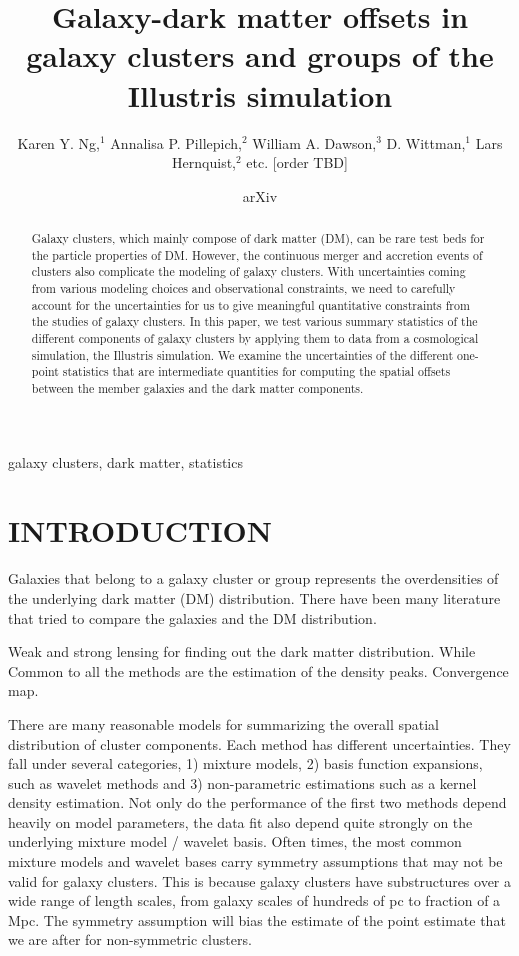 \documentclass[usenatbib]{mn2e}
\title[Galaxy-dark matter offsets in galaxy clusters and groups of the
Illustris simulation]
{Galaxy-dark matter offsets in galaxy clusters and groups of the
Illustris simulation}
\author[Karen Y. Ng et al.]{Karen Y. Ng,$^{1}$
	Annalisa P. Pillepich,$^{2}$ 
	William A. Dawson,$^{3}$ 
	D. Wittman,$^{1}$
	\newauthor Lars Hernquist,$^{2}$
	etc. [order TBD]
}
\begin{document}
\date{arXiv} \pagerange{\pageref{firstpage}--\pageref{lastpage}}
 \maketitle\label{firstpage}
\begin{abstract} 
	Galaxy clusters, which mainly compose of dark matter (DM), 
	can be rare test beds for the particle properties of DM.
	However, the continuous merger and accretion events of clusters also
	complicate the modeling of galaxy clusters.
	With uncertainties coming from various modeling choices and observational constraints, 
	we need to carefully account for the
	uncertainties for us to give meaningful quantitative constraints from 
	the studies of galaxy clusters. In this paper, 
	we test various summary statistics of the different components
	of galaxy clusters by applying them to data from a cosmological simulation,
	the Illustris simulation. 
	We examine the uncertainties of the different one-point statistics that
	are intermediate quantities for computing the spatial offsets between
	the member galaxies and the dark matter components. 
\end{abstract}

\begin{keywords}
	galaxy clusters, dark matter, statistics 
\end{keywords}

\section{INTRODUCTION} 
Galaxies that belong to a galaxy cluster or group represents the overdensities
of the underlying dark matter (DM) distribution. 
There have been many literature that tried to compare the galaxies and the DM
distribution. 


Weak and strong lensing for finding out the dark matter distribution. 
While 
Common to all the methods are the estimation of the density peaks. 
Convergence map.  


There are many reasonable models for summarizing the overall spatial
distribution of cluster components. Each method has different uncertainties.
They fall under several categories, 1) mixture models, 2) basis function
expansions, such as wavelet methods 
 and 3) non-parametric estimations such as a kernel density estimation. 
 Not only do the performance of the first two methods depend heavily on model parameters, 
the data fit also depend quite strongly on the underlying mixture model /
wavelet basis. Often times, the most common mixture models and wavelet bases 
carry symmetry assumptions that may not be valid for galaxy clusters. 
This is because galaxy clusters have substructures over a wide range of length
scales, from galaxy scales of hundreds of pc to fraction of a Mpc. 
The symmetry assumption will bias the estimate of the point estimate that we
are after for non-symmetric clusters.
\end{document}
